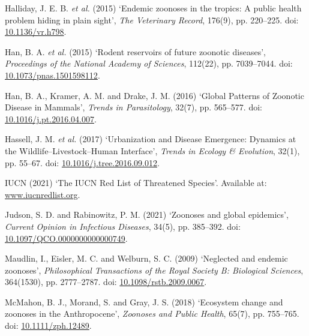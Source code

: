 \documentclass[
]{article}
\newlength{\cslhangindent}
\newlength{\cslentryspacingunit} %
\newenvironment{CSLReferences}[2] %
 {%
  \setlength{\parindent}{0pt}
  \ifodd #1
  \let\oldpar\par
  \def\par{\hangindent=\cslhangindent\oldpar}
  \fi
  \setlength{\parskip}{#2\cslentryspacingunit}
 }%
 {}
\begin{document}
\begin{CSLReferences}{0}{0}
\leavevmode{}%
Halliday, J. E. B. \emph{et al.} (2015) {`Endemic zoonoses in the
tropics: A public health problem hiding in plain sight'}, \emph{The
Veterinary Record}, 176(9), pp. 220--225. doi:
\href{https://doi.org/10.1136/vr.h798}{10.1136/vr.h798}.

\leavevmode{}%
Han, B. A. \emph{et al.} (2015) {`Rodent reservoirs of future zoonotic
diseases'}, \emph{Proceedings of the National Academy of Sciences},
112(22), pp. 7039--7044. doi:
\href{https://doi.org/10.1073/pnas.1501598112}{10.1073/pnas.1501598112}.

\leavevmode{}%
Han, B. A., Kramer, A. M. and Drake, J. M. (2016) {`Global {Patterns} of
{Zoonotic} {Disease} in {Mammals}'}, \emph{Trends in Parasitology},
32(7), pp. 565--577. doi:
\href{https://doi.org/10.1016/j.pt.2016.04.007}{10.1016/j.pt.2016.04.007}.

\leavevmode{}%
Hassell, J. M. \emph{et al.} (2017) {`Urbanization and {Disease}
{Emergence}: {Dynamics} at the {Wildlife}--{Livestock}--{Human}
{Interface}'}, \emph{Trends in Ecology \& Evolution}, 32(1), pp. 55--67.
doi:
\href{https://doi.org/10.1016/j.tree.2016.09.012}{10.1016/j.tree.2016.09.012}.

\leavevmode{}%
IUCN (2021) {`The {IUCN} {Red} {List} of {Threatened} {Species}'}.
Available at: \href{https://www.iucnredlist.org}{www.iucnredlist.org}.

\leavevmode{}%
Judson, S. D. and Rabinowitz, P. M. (2021) {`Zoonoses and global
epidemics'}, \emph{Current Opinion in Infectious Diseases}, 34(5), pp.
385--392. doi:
\href{https://doi.org/10.1097/QCO.0000000000000749}{10.1097/QCO.0000000000000749}.

\leavevmode{}%
Maudlin, I., Eisler, M. C. and Welburn, S. C. (2009) {`Neglected and
endemic zoonoses'}, \emph{Philosophical Transactions of the Royal
Society B: Biological Sciences}, 364(1530), pp. 2777--2787. doi:
\href{https://doi.org/10.1098/rstb.2009.0067}{10.1098/rstb.2009.0067}.

\leavevmode{}%
McMahon, B. J., Morand, S. and Gray, J. S. (2018) {`Ecosystem change and
zoonoses in the {Anthropocene}'}, \emph{Zoonoses and Public Health},
65(7), pp. 755--765. doi:
\href{https://doi.org/10.1111/zph.12489}{10.1111/zph.12489}.


\end{CSLReferences}
\end{document}
